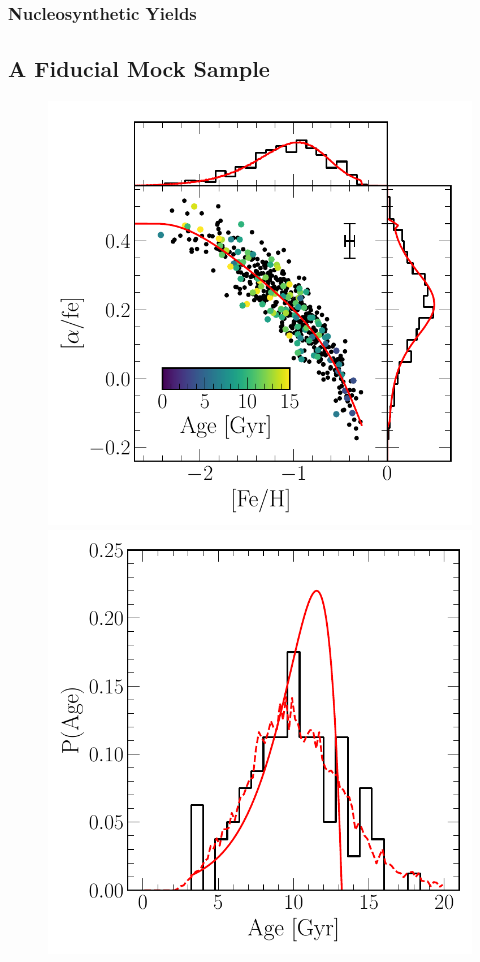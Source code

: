 \documentclass[ms.tex]{subfiles}
\begin{document}
\subsubsection{Nucleosynthetic Yields}
\label{sec:methods:onezone:yields}

\subsection{A Fiducial Mock Sample}
\label{sec:methods:fiducialmock}

\begin{figure}
\centering
\includegraphics[scale = 0.5]{fiducial_mock_afe_feh.pdf}
\includegraphics[scale = 0.42]{fiducial_mock_agedist.pdf}

\end{figure}
\end{document}
